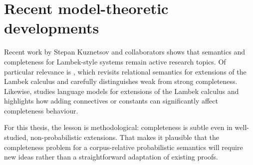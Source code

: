 \section{Recent model-theoretic developments}
Recent work by Stepan Kuznetsov and collaborators shows that semantics and completeness for
Lambek-style systems remain active research topics. Of particular relevance is
\citet{Kuznetsov2023}, which revisits relational semantics for extensions of the Lambek calculus
and carefully distinguishes weak from strong completeness. Likewise,
\citet{KanovichKuznetsovScedrov2022} studies language models for extensions of the Lambek
calculus and highlights how adding connectives or constants can significantly affect completeness
behaviour.

For this thesis, the lesson is methodological: completeness is subtle even in well-studied,
non-probabilistic extensions. That makes it plausible that the completeness problem for a
corpus-relative probabilistic semantics will require new ideas rather than a straightforward
adaptation of existing proofs.

